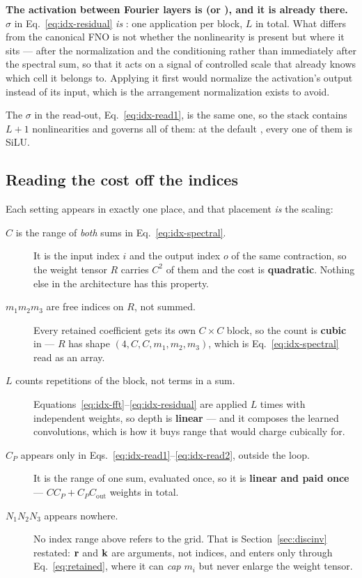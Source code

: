 \begin{pnote}
\textbf{The activation between Fourier layers is  (or ),
and it is already there.} $\sigma$ in Eq.~\eqref{eq:idx-residual} \emph{is}
: one application per block, $L$ in total. What differs
from the canonical FNO is not whether the nonlinearity is present but where it
sits --- after the normalization and the conditioning rather than immediately
after the spectral sum, so that it acts on a signal of controlled scale that
already knows which cell it belongs to. Applying it first would normalize the
activation's output instead of its input, which is the arrangement
normalization exists to avoid.

The $\sigma$ in the read-out, Eq.~\eqref{eq:idx-read1}, is the same one, so the
stack contains $L+1$ nonlinearities and  governs all of them:
at the default , every one of them is SiLU.
\end{pnote}

\subsection{Reading the cost off the indices}

Each setting appears in exactly one place, and that placement \emph{is} the
scaling:

\begin{description}
  \item[$C$ is the range of \emph{both} sums in Eq.~\eqref{eq:idx-spectral}.]
    It is the input index $i$ and the output index $o$ of the same
    contraction, so the weight tensor $R$ carries $C^2$ of them and the cost
    is \textbf{quadratic}. Nothing else in the architecture has this property.
  \item[$m_1 m_2 m_3$ are free indices on $R$, not summed.] Every retained
    coefficient gets its own $C \times C$ block, so the count is
    \textbf{cubic} in  --- $R$ has shape
    $(4, C, C, m_1, m_2, m_3)$, which is Eq.~\eqref{eq:idx-spectral} read as
    an array.
  \item[$L$ counts repetitions of the block, not terms in a sum.]
    Equations~\eqref{eq:idx-fft}--\eqref{eq:idx-residual} are applied $L$
    times with independent weights, so depth is \textbf{linear} --- and it
    composes the learned convolutions, which is how it buys range that
     would charge cubically for.
  \item[$C_P$ appears only in Eqs.~\eqref{eq:idx-read1}--\eqref{eq:idx-read2},
    outside the loop.] It is the range of one sum, evaluated once, so it is
    \textbf{linear and paid once} --- $C C_P + C_P C_{\mathrm{out}}$ weights
    in total.
  \item[$N_1 N_2 N_3$ appears nowhere.] No index range above refers to the
    grid. That is Section~\ref{sec:discinv} restated: $\mathbf{r}$ and $\mathbf{k}$ are
    arguments, not indices, and  enters only through
    Eq.~\eqref{eq:retained}, where it can \emph{cap} $m_i$ but never enlarge
    the weight tensor.
\end{description}

